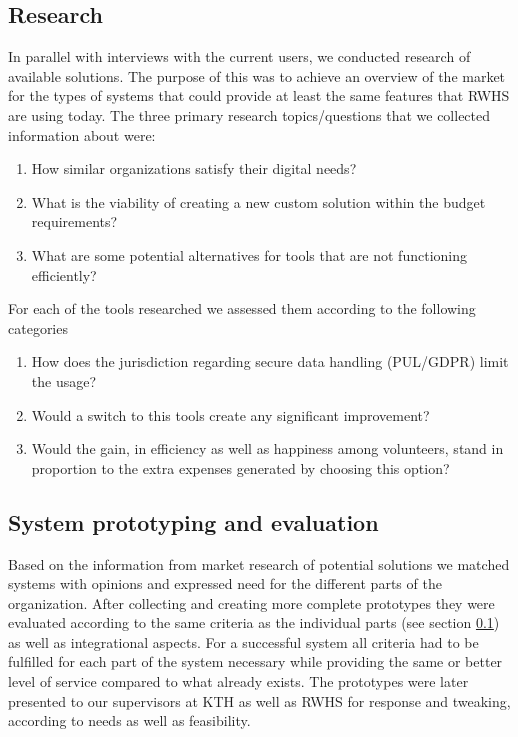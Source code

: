 \subsection{Research}
\label{sec:method:research}
In parallel with interviews with the current users, we conducted research of available solutions. The purpose of this was to achieve an overview of the market for the types of systems that could provide at least the same features that RWHS are using today. The three primary research topics/questions that we collected information about were:
\begin{enumerate}
\item How similar organizations satisfy their digital needs?
\item What is the viability of creating a new custom solution within the budget requirements? 
\item What are some potential alternatives for tools that are not functioning efficiently?
\end{enumerate}
For each of the tools researched we assessed them according to the following categories
\begin{enumerate}
\item How does the jurisdiction regarding secure data handling (PUL/GDPR) limit the usage?
\item Would a switch to this tools create any significant improvement?
\item Would the gain, in efficiency as well as happiness among volunteers, stand in proportion to the extra expenses generated by choosing this option?
\end{enumerate}

\subsection{System prototyping and evaluation}
\label{sec:method:prototyping}
Based on the information from market research of potential solutions we matched systems with opinions and expressed need for the different parts of the organization. After collecting and creating more complete prototypes they were evaluated according to the same criteria as the individual parts (see section \ref{sec:method:research}) as well as integrational aspects. For a successful system all criteria had to be fulfilled for each part of the system necessary while providing the same or better level of service compared to what already exists. The prototypes were later presented to our supervisors at KTH as well as RWHS for response and tweaking, according to needs as well as feasibility.






